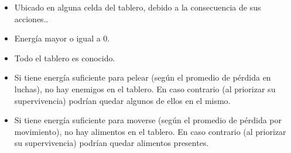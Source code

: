 \begin{itemize}
\item Ubicado en alguna celda del tablero, debido a la consecuencia de sus acciones..
\item Energía mayor o igual a 0.
\item Todo el tablero es conocido.
\item Si tiene energía suficiente para pelear (según el promedio de pérdida en
luchas), no hay enemigos en el tablero. En caso contrario (al priorizar su
supervivencia) podrían quedar algunos de ellos en el mismo.
\item Si tiene energía suficiente para moverse (según el promedio de pérdida
por movimiento), no hay alimentos en el tablero. En caso contrario (al priorizar
su supervivencia) podrían quedar alimentos presentes.
\end{itemize}
